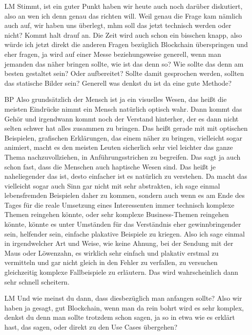 \begin{xlist}
    \item[LM] Stimmt, ist ein guter Punkt haben wir heute auch noch darüber diskutiert, also an wen ich denn genau das richten will. Weil genau die Frage kam nämlich auch auf, wir haben uns überlegt, mhm soll das jetzt technisch werden oder nicht? Kommt halt drauf an. Die Zeit wird auch schon ein bisschen knapp, also würde ich jetzt direkt die anderen Fragen bezüglich Blockchain überspringen und eher fragen, ja wird auf einer Messe beziehungsweise generell, wenn man jemanden das näher bringen sollte, wie ist das denn so? Wie sollte das denn am besten gestaltet sein? Oder aufbereitet? Sollte damit gesprochen werden, sollten das statische Bilder sein? Generell was denkst du ist da eine gute Methode?
    \item[BP] Also grundsätzlich der Mensch ist ja ein visuelles Wesen, das heißt die meisten Eindrücke nimmt ein Mensch natürlich optisch wahr. Dann kommt das Gehör und irgendwann kommt noch der Verstand hinterher, der es dann nicht selten schwer hat alles zusammen zu bringen. Das heißt gerade mit mit optischen Beispielen, grafischen Erklärungen, das einem näher zu bringen, vielleicht sogar animiert, macht es den meisten Leuten sicherlich sehr viel leichter das ganze Thema nachzuvollziehen, in Anführungsstrichen zu begreifen. Das sagt ja auch schon fast, dass die Menschen auch haptische Wesen sind. Das heißt je naheliegender das ist, desto einfacher ist es natürlich zu verstehen. Da macht das vielleicht sogar auch Sinn gar nicht mit sehr abstrakten, ich sage einmal lebensfremden Beispielen daher zu kommen, sondern auch wenn es am Ende des Tages für die reale Umsetzung eines Interessenten immer technisch komplexe Themen reingehen könnte, oder sehr komplexe Business-Themen reingehen könnte, könnte es unter Umständen für das Verständnis eher gewinnbringender sein, helfender sein, einfache plakative Beispiele zu kriegen. Also ich sage einmal in irgendwelcher Art und Weise, wie keine Ahnung, bei der Sendung mit der Maus oder Löwenzahn, es wirklich sehr einfach und plakativ erstmal zu vermitteln und gar nicht gleich in den Fehler zu verfallen, zu versuchen gleichzeitig komplexe Fallbeispiele zu erläutern. Das wird wahrscheinlich dann sehr schnell scheitern.
    \item[LM] Und wie meinst du dann, dass diesbezüglich man anfangen sollte? Also wir haben ja gesagt, gut Blockchain, wenn man da rein bohrt wird es sehr komplex, denkst du denn man sollte trotzdem schon sagen, ja so in etwa wie es erklärt hast, das sagen, oder direkt zu den Use Cases übergehen?

\end{xlist}
